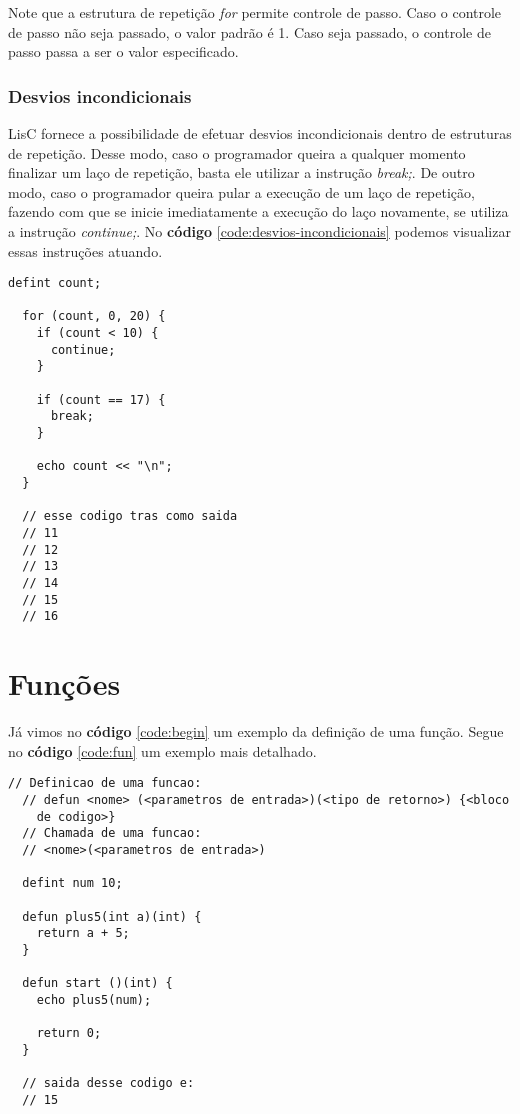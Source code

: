 \documentclass[
  12pt,				%
  oneside,			%
  a4paper,			%
  english,			%
  french,				%
  spanish,			%
  brazil,				%
]{abntex2}
\begin{document}
Note que a estrutura de repetição \emph{for} permite controle de
passo. Caso o controle de passo não seja passado, o valor padrão é
1. Caso seja passado, o controle de passo passa a ser o valor especificado.

\subsection{Desvios incondicionais}
\label{subsec:desvios-incondicionais}

LisC fornece a possibilidade de efetuar desvios incondicionais dentro
de estruturas de repetição. Desse modo, caso o programador queira a
qualquer momento finalizar um laço de repetição, basta ele utilizar a
instrução \emph{break;}. De outro modo, caso o programador queira pular
a execução de um laço de repetição, fazendo com que se inicie
imediatamente a execução do laço novamente, se utiliza a instrução
\emph{continue;}. No \textbf{código} \ref{code:desvios-incondicionais}
podemos visualizar essas instruções atuando.

\begin{lstlisting}[label=code:desvios-incondicionais,caption=Exemplo
  de código de desvios incondicionais]
  defint count;

  for (count, 0, 20) {
    if (count < 10) {
      continue;
    }

    if (count == 17) {
      break;
    }

    echo count << "\n";
  }

  // esse codigo tras como saida
  // 11
  // 12
  // 13
  // 14
  // 15
  // 16
\end{lstlisting}

\chapter{Funções}
\label{cha:funcoes}

Já vimos no \textbf{código} \ref{code:begin} um exemplo da definição
de uma função. Segue no \textbf{código} \ref{code:fun} um exemplo mais
detalhado.

\begin{lstlisting}[label=code:fun,caption=Exemplo de definição de uma
  função]
  // Definicao de uma funcao:
  // defun <nome> (<parametros de entrada>)(<tipo de retorno>) {<bloco
    de codigo>}
  // Chamada de uma funcao:
  // <nome>(<parametros de entrada>)

  defint num 10;
  
  defun plus5(int a)(int) {
    return a + 5;
  }

  defun start ()(int) {
    echo plus5(num);

    return 0;
  }

  // saida desse codigo e:
  // 15
\end{lstlisting}
\end{document}
